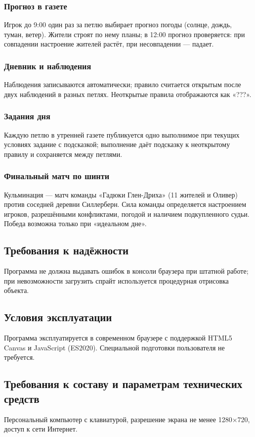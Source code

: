 \documentclass[12pt]{article}
\begin{document}
\subsubsection{Прогноз в газете}
Игрок до 9:00 один раз за петлю выбирает прогноз погоды (солнце, дождь, туман, ветер). Жители строят по нему планы; в 12:00 прогноз проверяется: при совпадении настроение жителей растёт, при несовпадении — падает.
\subsubsection{Дневник и наблюдения}
Наблюдения записываются автоматически; правило считается открытым после двух наблюдений в разных петлях. Неоткрытые правила отображаются как «???».
\subsubsection{Задания дня}
Каждую петлю в утренней газете публикуется одно выполнимое при текущих условиях задание с подсказкой; выполнение даёт подсказку к неоткрытому правилу и сохраняется между петлями.
\subsubsection{Финальный матч по шинти}
Кульминация — матч команды «Гадюки Глен-Дриха» (11 жителей и Оливер) против соседней деревни Силлерберн. Сила команды определяется настроением игроков, разрешёнными конфликтами, погодой и наличием подкупленного судьи. Победа возможна только при «идеальном дне».
\subsection{Требования к надёжности}
Программа не должна выдавать ошибок в консоли браузера при штатной работе; при невозможности загрузить спрайт используется процедурная отрисовка объекта.
\subsection{Условия эксплуатации}
Программа эксплуатируется в современном браузере с поддержкой HTML5 Canvas и JavaScript (ES2020). Специальной подготовки пользователя не требуется.
\subsection{Требования к составу и параметрам технических средств}
Персональный компьютер с клавиатурой, разрешение экрана не менее 1280×720, доступ к сети Интернет.
\end{document}
